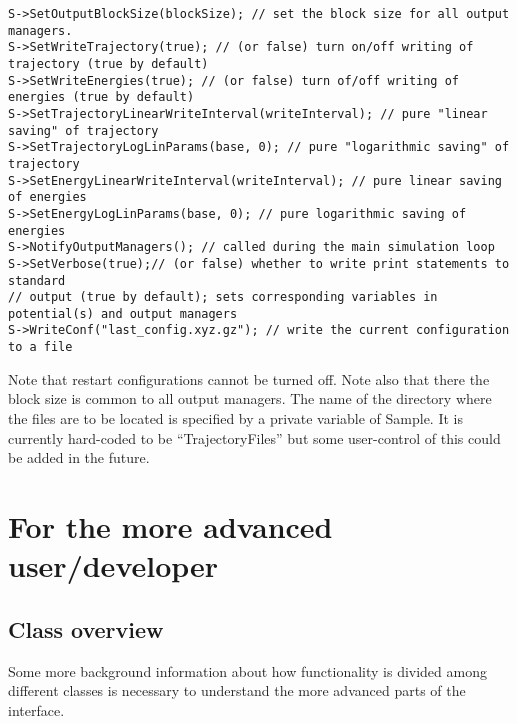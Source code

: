 \documentclass[a4paper]{article}
\begin{document}
\begin{verbatim}
S->SetOutputBlockSize(blockSize); // set the block size for all output managers.
S->SetWriteTrajectory(true); // (or false) turn on/off writing of trajectory (true by default)
S->SetWriteEnergies(true); // (or false) turn of/off writing of energies (true by default)
S->SetTrajectoryLinearWriteInterval(writeInterval); // pure "linear saving" of trajectory
S->SetTrajectoryLogLinParams(base, 0); // pure "logarithmic saving" of trajectory
S->SetEnergyLinearWriteInterval(writeInterval); // pure linear saving of energies
S->SetEnergyLogLinParams(base, 0); // pure logarithmic saving of energies
S->NotifyOutputManagers(); // called during the main simulation loop
S->SetVerbose(true);// (or false) whether to write print statements to standard
// output (true by default); sets corresponding variables in potential(s) and output managers 
S->WriteConf("last_config.xyz.gz"); // write the current configuration to a file
\end{verbatim}


\noindent Note that restart configurations cannot be turned off. Note also that
there the block size is common to all output managers. The name of the directory
where the files are to be located is specified by a private variable of Sample.
It is currently hard-coded to be ``TrajectoryFiles'' but some user-control of 
this could be added in the future.

\section{For the more advanced user/developer}

\subsection{Class overview}

Some more background information about how functionality is divided among
different classes is necessary to understand the more advanced parts of the
interface.
\end{document}
